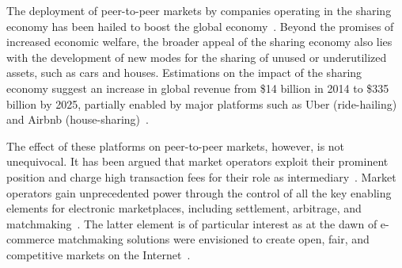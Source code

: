 The deployment of peer-to-peer markets by companies operating in the sharing economy has been hailed to boost the global economy~\cite{malhotra2014dark}.
Beyond the promises of increased economic welfare, the broader appeal of the sharing economy also lies with the development of new modes for the sharing of unused or underutilized assets, such as cars and houses. %
Estimations on the impact of the sharing economy suggest an increase in global revenue from \$14 billion in 2014 to \$335 billion by 2025, partially enabled by major platforms such as Uber (ride-hailing) and Airbnb (house-sharing)~\cite{pwcsharingeconomy}. %

The effect of these platforms on peer-to-peer markets, however, is not unequivocal.
It has been argued that market operators exploit their prominent position and charge high transaction fees for their role as intermediary~\cite{schor2016debating}. %
Market operators gain unprecedented power through the control of all the key enabling elements for electronic marketplaces, including settlement, arbitrage, and matchmaking~\cite{oecd2019,pepper2019,azevedo2016}.
The latter element is of particular interest as at the dawn of e-commerce matchmaking solutions were envisioned to create open, fair, and competitive markets on the Internet~\cite{trastour2002}.

